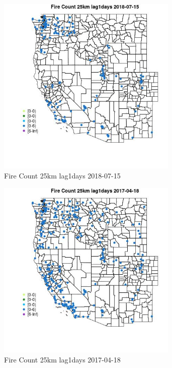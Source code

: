 \begin{figure} 
\centering  
\includegraphics[width=0.77\textwidth]{Code_Outputs/Report_ML_input_PM25_Step4_part_e_de_duplicated_aves_compiled_2019-05-20wNAs_MapObsFire_Count_25km_lag1days2018-07-15.jpg} 
\caption{\label{fig:Report_ML_input_PM25_Step4_part_e_de_duplicated_aves_compiled_2019-05-20wNAsMapObsFire_Count_25km_lag1days2018-07-15}Fire Count 25km lag1days 2018-07-15} 
\end{figure} 
 

\begin{figure} 
\centering  
\includegraphics[width=0.77\textwidth]{Code_Outputs/Report_ML_input_PM25_Step4_part_e_de_duplicated_aves_compiled_2019-05-20wNAs_MapObsFire_Count_25km_lag1days2017-04-18.jpg} 
\caption{\label{fig:Report_ML_input_PM25_Step4_part_e_de_duplicated_aves_compiled_2019-05-20wNAsMapObsFire_Count_25km_lag1days2017-04-18}Fire Count 25km lag1days 2017-04-18} 
\end{figure} 
 

